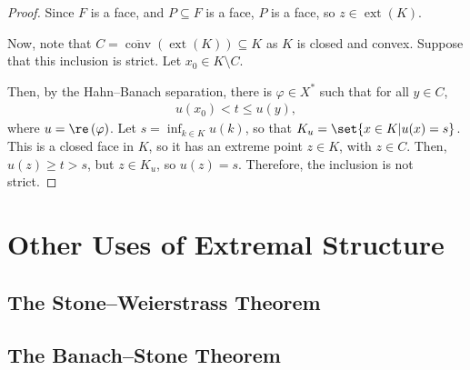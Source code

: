 \documentclass[10pt]{mypackage}
\begin{document}
\begin{proof}
  Since $F$ is a face, and $P\subseteq F$ is a face, $P$ is a face, so $z\in \operatorname{ext}\left( K \right)$.\newline

  Now, note that $C = \overline{\operatorname{conv}}\left( \operatorname{ext}\left( K \right) \right)\subseteq K$ as $K$ is closed and convex. Suppose that this inclusion is strict. Let $x_0\in K\setminus C$.\newline

  Then, by the Hahn--Banach separation, there is $\varphi\in X^{\ast}$ such that for all $y\in C$,
  \begin{align*}
    u\left( x_0 \right) < t \leq u(y),
  \end{align*}
  where $u = \re\left( \varphi \right)$. Let $s = \inf_{k\in K}u(k)$, so that $K_u = \set{x\in K | u(x) = s}$. This is a closed face in $K$, so it has an extreme point $z\in K$, with $z\in C$. Then, $u(z) \geq t > s$, but $z\in K_u$, so $u(z) = s$. Therefore, the inclusion is not strict.
\end{proof}

\section{Other Uses of Extremal Structure}%
\subsection{The Stone--Weierstrass Theorem}%
\subsection{The Banach--Stone Theorem}%
\end{document}
